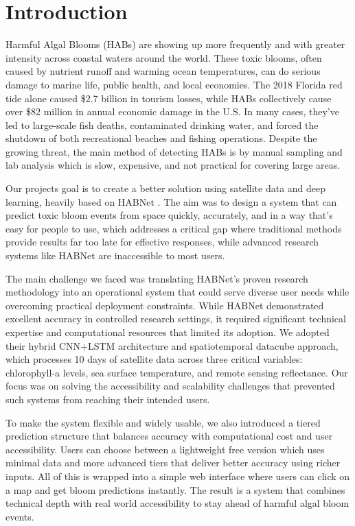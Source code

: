 \documentclass[conference]{IEEEtran}
\begin{document}
\section{Introduction}

Harmful Algal Blooms (HABs) are showing up more frequently and with greater intensity across coastal waters around the world. These toxic blooms, often caused by nutrient runoff and warming ocean temperatures, can do serious damage to marine life, public health, and local economies. The 2018 Florida red tide alone caused \$2.7 billion in tourism losses, while HABs collectively cause over \$82 million in annual economic damage in the U.S. In many cases, they've led to large-scale fish deaths, contaminated drinking water, and forced the shutdown of both recreational beaches and fishing operations. Despite the growing threat, the main method of detecting HABs is by manual sampling and lab analysis which is slow, expensive, and not practical for covering large areas.

Our projects goal is to create a better solution using satellite data and deep learning, heavily based on HABNet \cite{b1}. The aim was to design a system that can predict toxic bloom events from space quickly, accurately, and in a way that's easy for people to use, which addresses a critical gap where traditional methods provide results far too late for effective responses, while advanced research systems like HABNet are inaccessible to most users. 

The main challenge we faced was translating HABNet's proven research methodology into an operational system that could serve diverse user needs while overcoming practical deployment constraints. While HABNet demonstrated excellent accuracy in controlled research settings, it required significant technical expertise and computational resources that limited its adoption. We adopted their hybrid CNN+LSTM architecture and spatiotemporal datacube approach, which processes 10 days of satellite data across three critical variables: chlorophyll-a levels, sea surface temperature, and remote sensing reflectance. Our focus was on solving the accessibility and scalability challenges that prevented such systems from reaching their intended users.

To make the system flexible and widely usable, we also introduced a tiered prediction structure that balances accuracy with computational cost and user accessibility. Users can choose between a lightweight free version which uses minimal data and more advanced tiers that deliver better accuracy using richer inputs. All of this is wrapped into a simple web interface where users can click on a map and get bloom predictions instantly. The result is a system that combines technical depth with real world accessibility to stay ahead of harmful algal bloom events.
\end{document}
